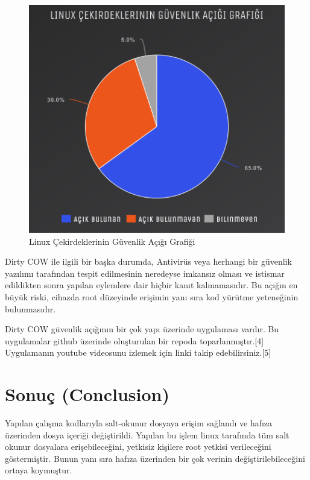 \documentclass[conference, 12pt, a4paper]{IEEEtran}
\begin{document}
\begin{sloppypar}
    \begin{figure}[htbp]
        \centering
        \includegraphics[scale=0.40]{linux-grafik.png}
        \caption{Linux Çekirdeklerinin Güvenlik Açığı Grafiği}
    \end{figure}

    Dirty COW ile ilgili bir başka durumda, Antivirüs veya herhangi bir güvenlik yazılımı tarafından tespit edilmesinin neredeyse imkansız olması ve istismar edildikten sonra yapılan eylemlere dair hiçbir kanıt kalmamasıdır. Bu açığın en büyük riski, cihazda root düzeyinde erişimin yanı sıra kod yürütme yeteneğinin bulunmasıdır.

    Dirty COW güvenlik açığının bir çok yapı üzerinde uygulaması vardır. Bu uygulamalar github üzerinde oluşturulan bir repoda toparlanmıştır.[4] Uygulamanın youtube videosunu izlemek için linki takip edebilirsiniz.[5]

\section{Sonuç (Conclusion)}
    Yapılan çalışma kodlarıyla salt-okunur dosyaya erişim sağlandı ve hafıza üzerinden dosya içeriği değiştirildi. Yapılan bu işlem linux tarafında tüm salt okunur dosyalara erişebileceğini, yetkisiz kişilere root yetkisi verileceğini göstermiştir. Bunun yanı sıra hafıza üzerinden bir çok verinin değiştirilebileceğini ortaya koymuştur.


\end{sloppypar}
\end{document}
